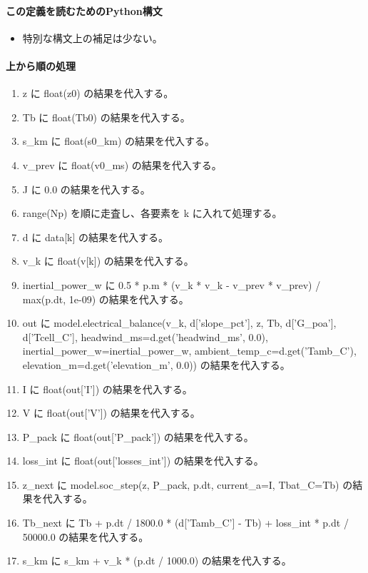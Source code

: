 \documentclass[a4paper,11pt]{article}
\begin{document}
            \paragraph{この定義を読むためのPython構文}
            \begin{itemize}[leftmargin=1.6em]
            \item 特別な構文上の補足は少ない。
            \end{itemize}
            \paragraph{上から順の処理}
            \begin{enumerate}[leftmargin=1.8em]
            \item z に float(z0) の結果を代入する。
\item Tb に float(Tb0) の結果を代入する。
\item s\_km に float(s0\_km) の結果を代入する。
\item v\_prev に float(v0\_ms) の結果を代入する。
\item J に 0.0 の結果を代入する。
\item range(Np) を順に走査し、各要素を k に入れて処理する。
\item   d に data[k] の結果を代入する。
\item   v\_k に float(v[k]) の結果を代入する。
\item   inertial\_power\_w に 0.5 * p.m * (v\_k * v\_k - v\_prev * v\_prev) / max(p.dt, 1e-09) の結果を代入する。
\item   out に model.electrical\_balance(v\_k, d['slope\_pct'], z, Tb, d['G\_poa'], d['Tcell\_C'], headwind\_ms=d.get('headwind\_ms', 0.0), inertial\_power\_w=inertial\_power\_w, ambient\_temp\_c=d.get('Tamb\_C'), elevation\_m=d.get('elevation\_m', 0.0)) の結果を代入する。
\item   I に float(out['I']) の結果を代入する。
\item   V に float(out['V']) の結果を代入する。
\item   P\_pack に float(out['P\_pack']) の結果を代入する。
\item   loss\_int に float(out['losses\_int']) の結果を代入する。
\item   z\_next に model.soc\_step(z, P\_pack, p.dt, current\_a=I, Tbat\_C=Tb) の結果を代入する。
\item   Tb\_next に Tb + p.dt / 1800.0 * (d['Tamb\_C'] - Tb) + loss\_int * p.dt / 50000.0 の結果を代入する。
\item   s\_km に s\_km + v\_k * (p.dt / 1000.0) の結果を代入する。

\end{enumerate}
\end{document}
